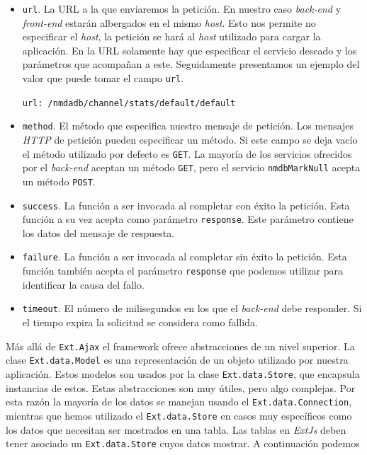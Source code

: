 	\begin{itemize}
		\item	\texttt{url}. La URL a la que enviaremos la petición. En nuestro caso \emph{back-end} y \emph{front-end} estarán albergados en
			el mismo \emph{host}. Esto nos permite no especificar el \emph{host}, la petición se hará al \emph{host} utilizado para cargar
			la aplicación. En la URL solamente hay que especificar el servicio deseado y los parámetros que acompañan a este.
			Seguidamente presentamos un ejemplo del valor que puede tomar el campo \texttt{url}.
    				\begin{center} \texttt{url: \cc/nmdadb/channel/stats/default/default\cc}  \end{center}
		\item	\texttt{method}. El método que especifica nuestro mensaje de petición. Los mensajes \emph{HTTP} de petición pueden especificar
			un método. Si este campo se deja vacío el método utilizado por defecto es \texttt{GET}. La mayoría de los servicios ofrecidos
			por el \emph{back-end} aceptan un método \texttt{GET}, pero el servicio \texttt{nmdbMarkNull} acepta un método \texttt{POST}.
		\item	\texttt{success}. La función a ser invocada al completar con éxito la petición. Esta función a su vez acepta como parámetro
		  	\texttt{response}. Este parámetro contiene los datos del mensaje de respuesta.
		\item	\texttt{failure}. La función a ser invocada al completar sin éxito la petición. Esta función también acepta el parámetro
		  	\texttt{response} que podemos utilizar para identificar la causa del fallo.
		\item	\texttt{timeout}. El número de milisegundos en los que el \emph{back-end} debe responder. Si el tiempo expira la solicitud se
		  	considera como fallida. 
	\end{itemize}
	Más allá de \texttt{Ext.Ajax} el framework ofrece abstracciones de un nivel superior. La clase \texttt{Ext.data.Model} es una representación
	de un objeto utilizado por nuestra aplicación. Estos modelos son usados por la clase \texttt{Ext.data.Store}, que encapsula instancias de
	estos. Estas abstracciones son muy útiles, pero algo complejas. Por esta razón la mayoría de los datos se manejan usando el
	\texttt{Ext.data.Connection}, mientras que hemos utilizado el \texttt{Ext.data.Store} en casos muy específicos como los datos que necesitan
	ser mostrados en una tabla. Las tablas en \emph{ExtJs} deben tener asociado un \texttt{Ext.data.Store} cuyos datos mostrar. A continuación podemos
